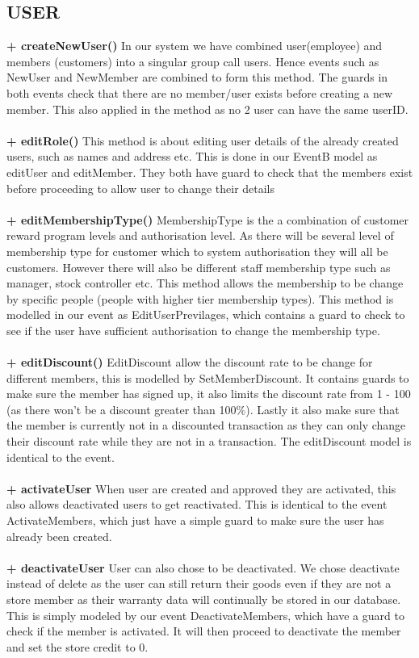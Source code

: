 \documentclass[a4paper]{article}
\begin{document}
\subsection{USER}
{\bf + createNewUser()}
In our system we have combined user(employee) and members (customers) into a singular group call users. Hence events such as NewUser and NewMember are combined to form this method. The guards in both events check that there are no member/user exists before creating a new member. This also applied in the method as no 2 user can have the same userID. 
\\\\
{\bf + editRole()}
This method is about editing user details of the already created users, such as names and address etc. This is done in our EventB model as editUser and editMember. They both have guard to check that the members exist before proceeding to allow user to change their details
\\\\
{\bf + editMembershipType()}
MembershipType is the a combination of customer reward program levels and authorisation level. As there will be several level of membership type for customer which to system authorisation they will all be customers. However there will also be different staff membership type such as manager, stock controller etc. This method allows the membership to be change by specific people (people with higher tier membership types). This method is modelled in our event as EditUserPrevilages, which contains a guard to check to see if the user have sufficient authorisation to change the membership type. 
\\\\
{\bf + editDiscount()}
EditDiscount allow the discount rate to be change for different members, this is modelled by SetMemberDiscount. It contains guards to make sure the member has signed up, it also limits the discount rate from 1 - 100 (as there won't be a discount greater than 100\%). Lastly it also make sure that the member is currently not in a discounted transaction as they can only change their discount rate while they are not in a transaction. The editDiscount model is identical to the event. 
\\\\
{\bf + activateUser}
When user are created and approved they are activated, this also allows deactivated users to get reactivated. This is identical to the event ActivateMembers, which just have a simple guard to make sure the user has already been created. 
\\\\
{\bf + deactivateUser}
User can also chose to be deactivated. We chose deactivate instead of delete as the user can still return their goods even if they are not a store member as their warranty data will continually be stored in our database. This is simply modeled by our event DeactivateMembers, which have a guard to check if the member is activated. It will then proceed to deactivate the member and set the store credit to 0.
\pagebreak
\end{document}
